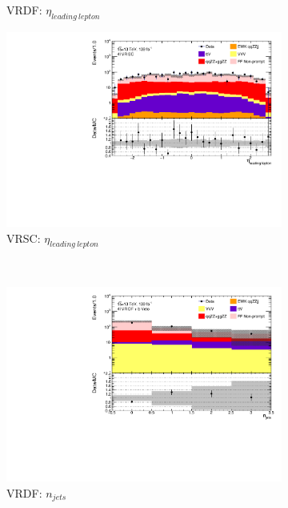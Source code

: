 \begin{figure}[!htb]
\begin{subfigure}{.48\textwidth}
        \caption{VRDF: $\eta_{leading~lepton}$ \label{fig:AllDataMCYield_VRDF_eta1} }
    \end{subfigure}
    \begin{subfigure}{.48\textwidth}
        \centering
        \includegraphics[width = 0.85\linewidth]{figures/Analysis/Background/Overlay_VRSC_FFApplied_eta1.pdf}
        \caption{VRSC: $\eta_{leading~lepton}$ \label{fig:AllDataMCYield_VRSC_eta1} }
    \end{subfigure}\\
    \begin{subfigure}{.48\textwidth}
        \centering
        \includegraphics[width = 0.85\linewidth]{figures/Analysis/Background/Overlay_VRDF_FFApplied_n_jets.pdf}
        \caption{VRDF: $n_{jets}$ \label{fig:AllDataMCYield_VRDF_njet} }
    \end{subfigure}
    \begin{subfigure}{.48\textwidth}
        \centering

\end{subfigure}
\end{figure}
